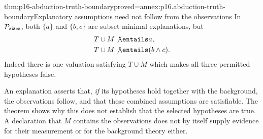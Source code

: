 \begin{hbtheorem}{thm:p16-abduction-truth-boundary}{proved=annex:p16.abduction-truth-boundary}{Explanatory assumptions need not follow from the observations}
In \(\mathcal P_{\rm sizes}\), both \(\{a\}\) and \(\{b,c\}\)
are subset-minimal explanations, but
\[
\begin{aligned}
 T\cup M&\not\entails a,\\
 T\cup M&\not\entails(b\land c).
\end{aligned}
\]
Indeed there is one valuation satisfying \(T\cup M\) which makes all
three permitted hypotheses false.
\end{hbtheorem}

An explanation asserts that, \emph{if} its hypotheses hold together with
the background, the observations follow, and that these combined assumptions
are satisfiable. The theorem shows why this does not establish that the
selected hypotheses are true. A declaration that \(M\) contains the
observations does not by itself supply evidence for their measurement or for
the background theory either.

